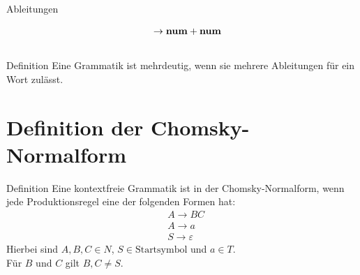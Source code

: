 \documentclass[t]{beamer}
\begin{document}
\begin{frame}
\begin{columns}[T]
\begin{column}{0.33\textwidth}
\begin{block}{Ableitungen}
\begin{minipage}[t][7.5cm]{\linewidth}
\begin{align*}
                            & \phantom{E} \rightarrow \bold{num} + \bold{num} \\
                        \end{align*}
                    \end{minipage}
                \end{block}
            \end{column}
        \end{columns}
        \begin{block}{Definition\cite{softwarelanguage}}
            Eine Grammatik ist mehrdeutig, wenn sie mehrere Ableitungen für ein Wort zulässt.
        \end{block}
    \end{frame}


    \section{Definition der Chomsky-Normalform}\label{sec:chomsky-normal-form-definition}
    \begin{frame}
        \begin{block}{Definition\cite{watrous2020}}
            Eine kontextfreie Grammatik ist in der Chomsky-Normalform, wenn jede Produktionsregel eine der folgenden Formen hat:
            \begin{align*}
                & A \rightarrow BC \\
                & A \rightarrow a \\
                & S \rightarrow \varepsilon
            \end{align*}
            Hierbei sind $A,B,C \in N$, $S \in \text{Startsymbol}$ und $a \in T$. \\
            Für $B$ und $C$ gilt $B,C \neq S$.
        \end{block}
    \end{frame}
\end{document}
